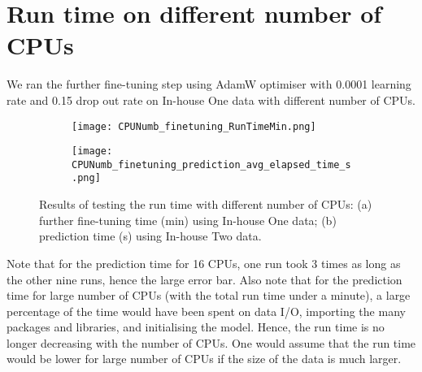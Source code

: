 \documentclass[a4paper,12pt]{article}
\newcommand{\figwidthhh}{0.45\textwidth}
\newcommand{\inghamOne}{In-house One\xspace}   %
\newcommand{\inghamTwo}{In-house Two\xspace}  %
\begin{document}
\newpage
\section{Run time on different number of CPUs}

We ran the further fine-tuning step using AdamW optimiser with 0.0001 learning rate and 0.15 drop out rate on \inghamOne data with different number of CPUs.

\begin{figure}[h!]
	\begin{center}
		\begin{subfigure}[b]{\figwidthhh}
			\caption{} 
			\texttt{[image: CPUNumb\_finetuning\_RunTimeMin.png]}
		\end{subfigure}
		\hfill
		\begin{subfigure}[b]{\figwidthhh}
			\caption{}
			\texttt{[image: CPUNumb\_finetuning\_prediction\_avg\_elapsed\_time\_s.png]}
		\end{subfigure}
	\end{center}                                                                
	\caption{Results of testing the run time with different number of CPUs: (a) further fine-tuning time (min) using \inghamOne data; (b) prediction time (s) using \inghamTwo data.
	}
\end{figure}

Note that for the prediction time for 16 CPUs, one run took 3 times as long as the other nine runs, hence the large error bar. Also note that for the prediction time for large number of CPUs (with the total run time under a minute), a large percentage of the time would have been spent on data I/O, importing the many packages and libraries, and initialising the model. Hence, the run time is no longer decreasing with the number of CPUs. One would assume that the run time would be lower for large number of CPUs if the size of the data is much larger. 
\end{document}
